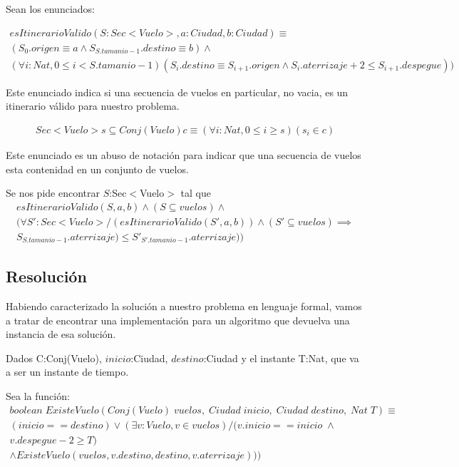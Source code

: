 Sean los enunciados:


\begin{align*}
esItinerarioValido(S:Sec<Vuelo> , a:Ciudad, b:Ciudad) \equiv \\
(S_{0}.origen \equiv a \wedge S_{S.tamanio-1}.destino \equiv b) \wedge \\ 
(\forall i:Nat, 0 \leq i <S.tamanio-1)(S_{i}.destino \equiv S_{i+1}.origen 
\wedge S_{i}.aterrizaje + 2 \leq S_{i+1}.despegue))
\end{align*}

Este enunciado indica si una secuencia de vuelos en particular, no vacia, es un itinerario v\'alido para nuestro problema.

\begin{align*}
Sec<Vuelo> s \subseteq Conj(Vuelo) c \equiv 
(\forall i:Nat, 0 \leq i \geq s )(s_{i} \in  c)
\end{align*}
 
Este enunciado es un abuso de notaci\'on para indicar que una secuencia de vuelos esta contenidad en un conjunto de vuelos.


Se nos pide encontrar $S$:Sec$<$Vuelo$>$ tal que 
\begin{align*}
esItinerarioValido(S,a,b) \wedge (S \subseteq vuelos) \wedge \\
(\forall S':Sec<Vuelo> / (esItinerarioValido(S',a,b)) \wedge (S' \subseteq vuelos) \implies \\  
S_{S.tamanio-1}.aterrizaje) \leq S'_{S'.tamanio-1}.aterrizaje))
\end{align*}

\newpage
\subsection{Resolución}

Habiendo caracterizado la soluci\'on a nuestro problema en lenguaje formal, vamos a tratar de encontrar una implementaci\'on para un algoritmo que devuelva una instancia de esa soluci\'on.

Dados C:Conj(Vuelo), $inicio$:Ciudad, $destino$:Ciudad y el instante T:Nat, que va a ser un instante de tiempo.

Sea la funci\'on:
\begin{align*}
boolean\;ExisteVuelo(Conj(Vuelo) \; vuelos,\; Ciudad\;inicio,\;Ciudad\;destino,\;Nat \;T) \equiv\\
(inicio == destino) \vee (\exists v:Vuelo, v \in vuelos) / (v.inicio == inicio \; \wedge \\ 
v.despegue - 2 \geq T) \\
\wedge ExisteVuelo(vuelos,v.destino, destino, v.aterrizaje)))  
\end{align*}

